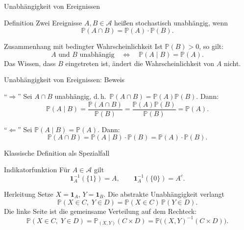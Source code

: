 \documentclass{beamer}
\begin{document}
\begin{frame}{Unabhängigkeit von Ereignissen}
\begin{block}{Definition}
Zwei Ereignisse \(A,B\in\mathcal A\) hei\ss{}en stochastisch unabhängig, wenn
\[
\mathbb P(A\cap B)=\mathbb P(A)\cdot\mathbb P(B).
\]
\end{block}

\begin{block}{Zusammenhang mit bedingter Wahrscheinlichkeit}
Ist \(\mathbb P(B)>0\), so gilt:
\[
A \text{ und } B \text{ unabhängig}
\quad\Longleftrightarrow\quad
\mathbb P(A\mid B)=\mathbb P(A).
\]
Das Wissen, dass \(B\) eingetreten ist, ändert die Wahrscheinlichkeit von \(A\) nicht.
\end{block}
\end{frame}

\begin{frame}{Unabhängigkeit von Ereignissen: Beweis}
\begin{block}{``\(\Rightarrow\)''}
Sei \(A\cap B\) unabhängig, d.\,h.\ \(\mathbb P(A\cap B)=\mathbb P(A)\mathbb P(B)\).
Dann:
\[
\mathbb P(A\mid B)=\frac{\mathbb P(A\cap B)}{\mathbb P(B)}=\frac{\mathbb P(A)\mathbb P(B)}{\mathbb P(B)}=\mathbb P(A).
\]
\end{block}

\begin{block}{``\(\Leftarrow\)''}
Sei \(\mathbb P(A\mid B)=\mathbb P(A)\). Dann:
\[
\mathbb P(A\cap B)=\mathbb P(A\mid B)\cdot\mathbb P(B)=\mathbb P(A)\cdot\mathbb P(B).
\]
\end{block}
\end{frame}

\begin{frame}{Klassische Definition als Spezialfall}
\begin{block}{Indikatorfunktion}
Für \(A\in\mathcal A\) gilt
\[
\mathbf{1}_A^{-1}(\{1\})=A,
\qquad
\mathbf{1}_A^{-1}(\{0\})=A^c.
\]
\end{block}

\begin{block}{Herleitung}
Setze \(X=\mathbf{1}_A\), \(Y=\mathbf{1}_B\). Die abstrakte Unabhängigkeit verlangt
\[
\mathbb P(X\in C,\;Y\in D)=\mathbb P(X\in C)\,\mathbb P(Y\in D).
\]
Die linke Seite ist die gemeinsame Verteilung auf dem Rechteck:
\[
\mathbb P(X\in C,\;Y\in D)
=\mathbb P_{(X,Y)}(C\times D)
=\mathbb P\bigl((X,Y)^{-1}(C\times D)\bigr).
\]
\end{block}
\end{frame}
\end{document}
